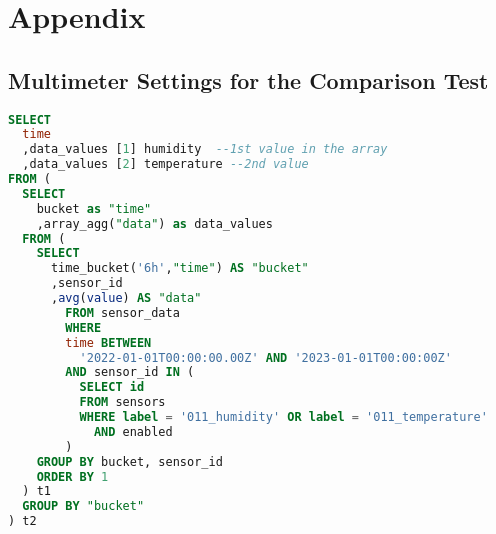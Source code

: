 \chapter{Appendix}
\section{Multimeter Settings for the Comparison Test}
\begin{lstlisting}[language=sql,title=SQL query]
SELECT
  time
  ,data_values [1] humidity  --1st value in the array
  ,data_values [2] temperature --2nd value
FROM (
  SELECT
    bucket as "time"
    ,array_agg("data") as data_values
  FROM (
    SELECT
      time_bucket('6h',"time") AS "bucket"
      ,sensor_id
      ,avg(value) AS "data"
        FROM sensor_data
        WHERE
        time BETWEEN
          '2022-01-01T00:00:00.00Z' AND '2023-01-01T00:00:00Z'
        AND sensor_id IN (
          SELECT id
          FROM sensors
          WHERE label = '011_humidity' OR label = '011_temperature'
            AND enabled
        )
    GROUP BY bucket, sensor_id
    ORDER BY 1
  ) t1
  GROUP BY "bucket"
) t2
\end{lstlisting}

